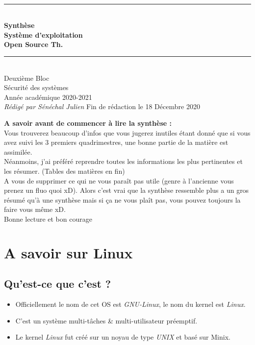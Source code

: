\documentclass[a4paper]{article}
\newcommand{\HRule}{\rule{\linewidth}{0.5mm}}
\newcommand{\bgimg}[1]{
\AddToShipoutPicture
   {
      \put(\LenToUnit{0 cm},\LenToUnit{0 cm})
      {
            \texttt{[image: \#1]} 
      }
   }
}
\begin{document}





  \begin{titlepage}
    \begin{sffamily}
    \begin{center}
      \textnormal{}\\[6.5cm]
      \HRule \\[0.4cm]
      { \Huge \bfseries Synthèse\\ Système d'exploitation \\Open Source Th.\\ [0.4cm] }
      \HRule \\[3cm]
      \Large
      Deuxième Bloc\\
      Sécurité des systèmes\\
      Année académique 2020-2021\\[0.2cm]
      \emph{Rédigé par Sénéchal Julien}
      \vfill
      {\large Fin de rédaction le 18 Décembre 2020}
    \end{center}
    \end{sffamily}
  \end{titlepage}

  \textbf{A savoir avant de commencer à lire la synthèse :}\\
  Vous trouverez beaucoup d'infos que vous jugerez inutiles étant donné que si vous avez suivi les 3 premiers quadrimestres, une bonne partie de la matière est assimilée.
  \\Néanmoins, j'ai préféré reprendre toutes les informations les plus pertinentes et les résumer. (Tables des matières en fin)\\
  A vous de supprimer ce qui ne vous paraît pas utile (genre à l'ancienne vous prenez un fluo quoi xD).
  Alors c'est vrai que la synthèse ressemble plus a un gros résumé qu'à une synthèse mais si ça ne vous plaît pas, vous pouvez toujours la faire vous même xD.\\
  Bonne lecture et bon courage
  \section{A savoir sur Linux}
  \subsection{Qu'est-ce que c'est ?}
  \begin{itemize}[label=\textbullet, font=\Large]
    \item Officiellement le nom de cet OS est \emph{GNU-Linux}, le nom du kernel est \emph{Linux}.
    \item C'est un système multi-tâches \& multi-utilisateur préemptif.
    \item Le kernel \emph{Linux} fut créé sur un noyau de type \emph{UNIX} et basé sur Minix.
  \end{itemize}
\end{document}
